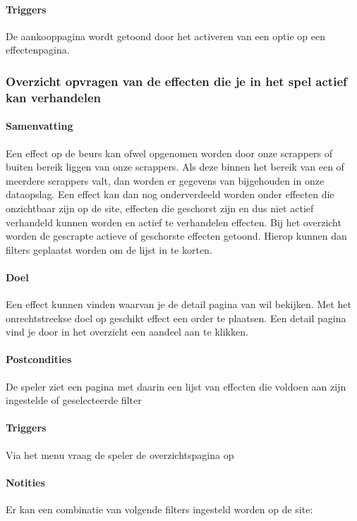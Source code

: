 \paragraph{Triggers} De aankooppagina wordt getoond door het activeren van een optie op een effectenpagina.



\subsubsection{Overzicht opvragen van de effecten die je in het spel actief kan verhandelen}
\paragraph{Samenvatting} Een effect op de beurs kan ofwel opgenomen worden door onze scrappers of buiten bereik liggen van onze scrappers.
Als deze binnen het bereik van een of meerdere scrappers valt, dan worden er gegevens van bijgehouden in onze dataopslag. Een effect kan dan nog onderverdeeld worden onder effecten die onzichtbaar zijn op de site, effecten die geschorst zijn en dus niet actief verhandeld kunnen worden en actief te verhandelen effecten. Bij het overzicht worden de gescrapte actieve of geschorste effecten getoond. Hierop kunnen dan filters geplaatst worden om de lijst in te korten.
\paragraph{Doel} Een effect kunnen vinden waarvan je de detail pagina van wil bekijken. Met het onrechtstreekse doel op geschikt effect een order te plaatsen. Een detail pagina vind je door in het overzicht een aandeel aan te klikken.
\paragraph{Postcondities} De speler ziet een pagina met daarin een lijst van effecten die voldoen aan zijn ingestelde of geselecteerde filter
\paragraph{Triggers} Via het menu vraag de speler de overzichtspagina op\paragraph{Notities} Er kan een combinatie van volgende filters ingesteld worden op de site:


